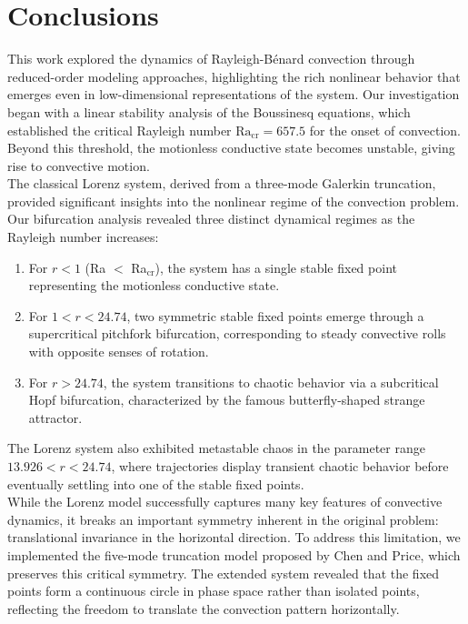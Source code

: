 \documentclass[paper=a4, fontsize=11pt]{scrartcl}
\numberwithin{equation}{section}		%
\numberwithin{figure}{section}			%
\numberwithin{table}{section}				%
\begin{document}
\section{Conclusions}

This work explored the dynamics of Rayleigh-Bénard convection through reduced-order modeling approaches, highlighting the rich nonlinear behavior that emerges even in low-dimensional representations of the system. Our investigation began with a linear stability analysis of the Boussinesq equations, which established the critical Rayleigh number $\text{Ra}_{\text{cr}} = 657.5$ for the onset of convection. Beyond this threshold, the motionless conductive state becomes unstable, giving rise to convective motion.\\

The classical Lorenz system, derived from a three-mode Galerkin truncation, provided significant insights into the nonlinear regime of the convection problem. Our bifurcation analysis revealed three distinct dynamical regimes as the Rayleigh number increases:

\begin{enumerate}
	\item For $r < 1$ (Ra $<$ Ra$_{\text{cr}}$), the system has a single stable fixed point representing the motionless conductive state.
	\item For $1 < r < 24.74$, two symmetric stable fixed points emerge through a supercritical pitchfork bifurcation, corresponding to steady convective rolls with opposite senses of rotation.
	\item For $r > 24.74$, the system transitions to chaotic behavior via a subcritical Hopf bifurcation, characterized by the famous butterfly-shaped strange attractor.
\end{enumerate}

\noindent The Lorenz system also exhibited metastable chaos in the parameter range $13.926 < r < 24.74$, where trajectories display transient chaotic behavior before eventually settling into one of the stable fixed points.\\

While the Lorenz model successfully captures many key features of convective dynamics, it breaks an important symmetry inherent in the original problem: translational invariance in the horizontal direction. To address this limitation, we implemented the five-mode truncation model proposed by Chen and Price, which preserves this critical symmetry. The extended system revealed that the fixed points form a continuous circle in phase space rather than isolated points, reflecting the freedom to translate the convection pattern horizontally.\\
\end{document}
